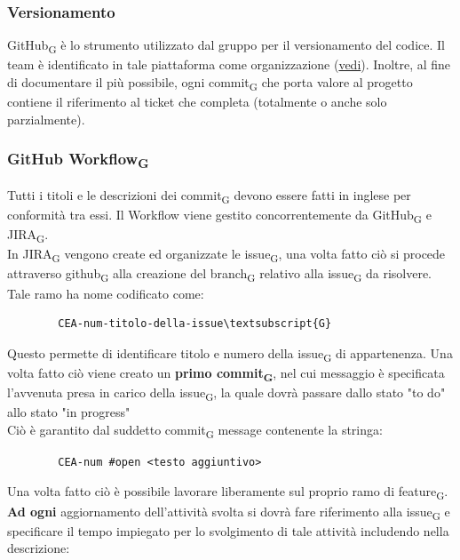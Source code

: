 	\subsubsection{Versionamento}
	GitHub\textsubscript{G} è lo strumento utilizzato dal gruppo per il versionamento del codice.
	\newline Il team è identificato in tale piattaforma come organizzazione (\href{https://github.com/catchEmAll-SWE}{vedi}).
	Inoltre, al fine di documentare il più possibile, ogni commit\textsubscript{G} che porta valore al progetto contiene il riferimento al ticket che completa (totalmente o anche solo parzialmente). 

	\subsubsection{GitHub Workflow\textsubscript{G}}
	Tutti i titoli e le descrizioni dei commit\textsubscript{G} devono essere fatti in inglese per conformità tra essi.
	\newline Il Workflow viene gestito concorrentemente da GitHub\textsubscript{G} e JIRA\textsubscript{G}. \\
In JIRA\textsubscript{G} vengono create ed organizzate le issue\textsubscript{G}, una volta fatto ciò si procede attraverso github\textsubscript{G} alla creazione del branch\textsubscript{G} relativo alla issue\textsubscript{G} da risolvere.\\
	Tale ramo ha nome codificato come:
	\begin{lstlisting}
		CEA-num-titolo-della-issue\textsubscript{G}
	\end{lstlisting}
	Questo permette di identificare titolo e numero della issue\textsubscript{G} di appartenenza. Una volta fatto ciò viene creato un \textbf{primo commit\textsubscript{G}}, nel cui messaggio è specificata l'avvenuta presa in carico della issue\textsubscript{G}, la quale dovrà passare dallo stato "to do" allo stato "in progress"\\
	Ciò è garantito dal suddetto commit\textsubscript{G} message contenente la stringa:
	\begin{lstlisting}
		CEA-num #open <testo aggiuntivo>
	\end{lstlisting}
	Una volta fatto ciò è possibile lavorare liberamente sul proprio ramo di feature\textsubscript{G}.
	\newline \textbf{Ad ogni} aggiornamento dell'attività svolta si dovrà fare riferimento alla issue\textsubscript{G} e specificare il tempo impiegato per lo svolgimento di tale attività includendo nella descrizione:
